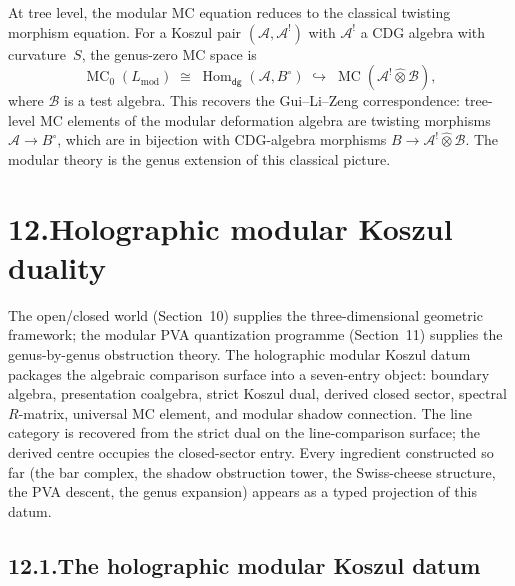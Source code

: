 \documentclass[11pt]{report}
\theoremstyle{definition}
\theoremstyle{remark}
\providecommand{\cA}{\mathcal{A}}
\providecommand{\cB}{\mathcal{B}}
\numberwithin{equation}{section}
\begin{document}
At tree level, the modular MC equation reduces to the
classical twisting morphism equation. For a Koszul pair
$(\cA,\cA^!)$ with $\cA^!$ a CDG algebra with curvature~$S$,
the genus-zero MC space is
\[
\operatorname{MC}_0(L_{\mathrm{mod}})
\;\cong\;
\operatorname{Hom}_{\mathsf{dg}}(\cA,B^\circ)
\;\hookrightarrow\;
\operatorname{MC}(\cA^!\widehat{\otimes}\cB),
\]
where $\cB$ is a test algebra. This recovers the Gui--Li--Zeng
correspondence: tree-level MC elements of the modular deformation
algebra are twisting morphisms $\cA\to B^\circ$, which are in
bijection with CDG-algebra morphisms $B\to\cA^!\widehat\otimes\cB$.
The modular theory is the genus extension of this classical picture.


\section*{12.\quad Holographic modular Koszul duality}

The open/closed world (Section~10) supplies the three-dimensional
geometric framework; the modular PVA quantization programme
(Section~11) supplies the genus-by-genus obstruction theory. The
holographic modular Koszul datum packages the algebraic comparison
surface into a seven-entry object: boundary algebra, presentation
coalgebra, strict Koszul dual, derived closed sector, spectral
$R$-matrix, universal MC element, and modular shadow connection.
The line category is recovered from the strict dual on the
line-comparison surface; the derived centre occupies the closed-sector
entry. Every
ingredient constructed so far (the bar complex, the shadow
obstruction tower, the Swiss-cheese structure, the PVA descent, the
genus expansion) appears as a typed projection of this datum.

\subsection*{12.1.\enspace The holographic modular Koszul datum}
\end{document}
